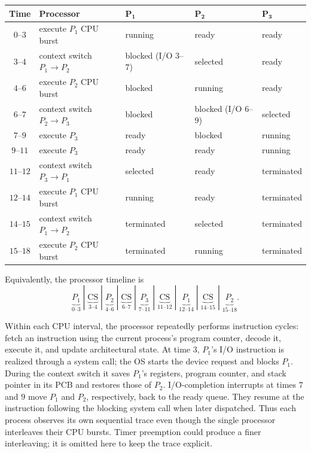 \begin{center}
\small
\begin{tabular}{c|l|l|l|l}
\textbf{Time} & \textbf{Processor} & \(\boldsymbol{P_1}\) &
  \(\boldsymbol{P_2}\) & \(\boldsymbol{P_3}\)\\ \hline
\(0\)--\(3\)   & execute \(P_1\) CPU burst & running & ready & ready\\
\(3\)--\(4\)   & context switch \(P_1\!\to\!P_2\) &
  blocked (I/O \(3\)--\(7\)) & selected & ready\\
\(4\)--\(6\)   & execute \(P_2\) CPU burst &
  blocked & running & ready\\
\(6\)--\(7\)   & context switch \(P_2\!\to\!P_3\) &
  blocked & blocked (I/O \(6\)--\(9\)) & selected\\
\(7\)--\(9\)   & execute \(P_3\) & ready & blocked & running\\
\(9\)--\(11\)  & execute \(P_3\) & ready & ready & running\\
\(11\)--\(12\) & context switch \(P_3\!\to\!P_1\) &
  selected & ready & terminated\\
\(12\)--\(14\) & execute \(P_1\) CPU burst &
  running & ready & terminated\\
\(14\)--\(15\) & context switch \(P_1\!\to\!P_2\) &
  terminated & selected & terminated\\
\(15\)--\(18\) & execute \(P_2\) CPU burst &
  terminated & running & terminated
\end{tabular}
\end{center}

Equivalently, the processor timeline is
\[
\underbrace{P_1}_{0\text{--}3}\;|\;
\underbrace{\mathrm{CS}}_{3\text{--}4}\;|\;
\underbrace{P_2}_{4\text{--}6}\;|\;
\underbrace{\mathrm{CS}}_{6\text{--}7}\;|\;
\underbrace{P_3}_{7\text{--}11}\;|\;
\underbrace{\mathrm{CS}}_{11\text{--}12}\;|\;
\underbrace{P_1}_{12\text{--}14}\;|\;
\underbrace{\mathrm{CS}}_{14\text{--}15}\;|\;
\underbrace{P_2}_{15\text{--}18}.
\]

Within each CPU interval, the processor repeatedly performs instruction
cycles: fetch an instruction using the current process's program counter,
decode it, execute it, and update architectural state.  At time \(3\),
\(P_1\)'s I/O instruction is realized through a system call; the OS starts
the device request and blocks \(P_1\).  During the context switch it saves
\(P_1\)'s registers, program counter, and stack pointer in its PCB and
restores those of \(P_2\).  I/O-completion interrupts at times \(7\) and \(9\)
move \(P_1\) and \(P_2\), respectively, back to the ready queue.  They resume
at the instruction following the blocking system call when later dispatched.
Thus each process observes its own sequential trace even though the single
processor interleaves their CPU bursts.  Timer preemption could produce a
finer interleaving; it is omitted here to keep the trace explicit.

